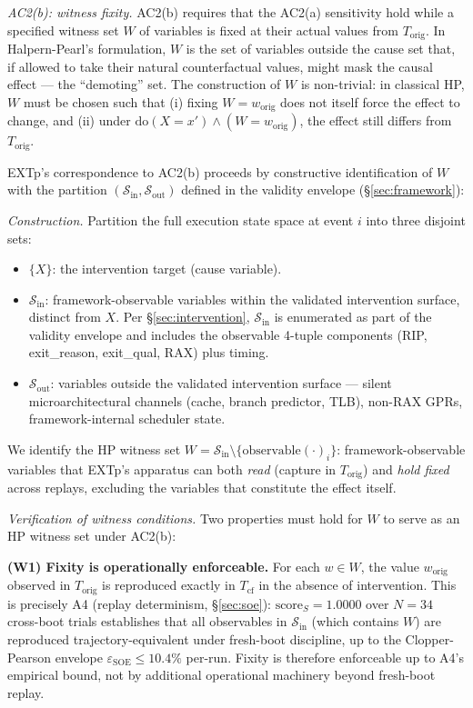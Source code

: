 \documentclass[conference]{IEEEtran}
\newcommand{\Korig}{T_\text{orig}}
\newcommand{\Tcf}{T_\text{cf}}
\newcommand{\scoreS}{\text{score}_S}
\newcommand{\dox}[1]{\text{do}(X{=}#1)}
\newcommand{\epsSOE}{\varepsilon_\text{SOE}}
\begin{document}
\emph{AC2(b): witness fixity.} AC2(b) requires that the AC2(a)
sensitivity hold while a specified witness set $W$ of variables
is fixed at their actual values from $\Korig$. In Halpern-Pearl's
formulation, $W$ is the set of variables outside the cause set
that, if allowed to take their natural counterfactual values,
might mask the causal effect --- the ``demoting'' set. The
construction of $W$ is non-trivial: in classical HP, $W$ must be
chosen such that (i) fixing $W = w_{\text{orig}}$ does not itself
force the effect to change, and (ii) under
$\dox{x'} \wedge (W = w_{\text{orig}})$, the effect still differs
from $\Korig$.

EXTp's correspondence to AC2(b) proceeds by constructive
identification of $W$ with the partition
$(\mathcal{S}_\text{in}, \mathcal{S}_\text{out})$ defined in the
validity envelope (\S\ref{sec:framework}):

\emph{Construction.} Partition the full execution state space at
event $i$ into three disjoint sets:
\begin{itemize}[leftmargin=*]
  \item $\{X\}$: the intervention target (cause variable).
  \item $\mathcal{S}_\text{in}$: framework-observable variables
    within the validated intervention surface, distinct from $X$.
    Per \S\ref{sec:intervention}, $\mathcal{S}_\text{in}$ is
    enumerated as part of the validity envelope and includes the
    observable 4-tuple components (RIP, exit\_reason, exit\_qual,
    RAX) plus timing.
  \item $\mathcal{S}_\text{out}$: variables outside the validated
    intervention surface --- silent microarchitectural channels
    (cache, branch predictor, TLB), non-RAX GPRs,
    framework-internal scheduler state.
\end{itemize}

We identify the HP witness set $W = \mathcal{S}_\text{in}
\setminus \{\text{observable}(\cdot)_i\}$: framework-observable
variables that EXTp's apparatus can both \emph{read} (capture in
$\Korig$) and \emph{hold fixed} across replays, excluding the
variables that constitute the effect itself.

\emph{Verification of witness conditions.} Two properties must
hold for $W$ to serve as an HP witness set under AC2(b):

\textbf{(W1) Fixity is operationally enforceable.} For each
$w \in W$, the value $w_{\text{orig}}$ observed in $\Korig$ is
reproduced exactly in $\Tcf$ in the absence of intervention. This
is precisely A4 (replay determinism, \S\ref{sec:soe}):
$\scoreS = 1.0000$ over $N{=}34$ cross-boot trials establishes
that all observables in $\mathcal{S}_\text{in}$ (which contains
$W$) are reproduced trajectory-equivalent under fresh-boot
discipline, up to the Clopper-Pearson envelope
$\epsSOE \leq 10.4\%$ per-run. Fixity is therefore enforceable
up to A4's empirical bound, not by additional operational
machinery beyond fresh-boot replay.
\end{document}
